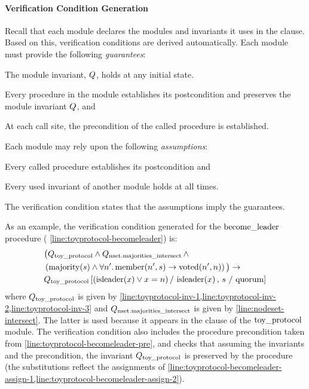 \paragraph{Verification Condition Generation}
Recall that each module declares the modules and invariants it uses in the  clause.
Based on this, verification conditions are derived automatically.
Each module must provide the following \emph{guarantees}:
\begin{inparaenum}[1)]
\item The module invariant, $Q$, holds at any initial state.
\item Every procedure in the module establishes its postcondition and preserves the module invariant $Q$, and
\item At each call site, the precondition of the called procedure is established.
\end{inparaenum}
Each module may rely upon the following \emph{assumptions}:
\begin{inparaenum}[1)]
\item Every called procedure establishes its postcondition and
\item Every used invariant of another module holds at all times.
\end{inparaenum}
The verification condition states that the assumptions imply the guarantees.

As an example, the verification condition generated for the ${\text{become\_leader}}$ procedure ( \cref{line:toyprotocol-becomeleader}) is:
\begin{align*}
&
\big( Q_{\text{toy\_protocol}} \land
Q_{{\text{nset}}.{\text{majorities\_intersect}}} \, \land \\
&
\left( {\text{majority}}(s) \land \forall n'. \, {\text{member}}(n' , s) \to {\text{voted}}(n', n) \right)
\big) \to \\
&
Q_{\text{toy\_protocol}} \left[\left({\text{isleader}}(x) \lor x=n\right) /~ {\text{isleader}}(x) \,,\,  s ~/~ {\text{quorum}} \right]
\end{align*}
where $Q_{\text{toy\_protocol}}$ is given by 
\cref{line:toyprotocol-inv-1,line:toyprotocol-inv-2,line:toyprotocol-inv-3} and \linebreak $Q_{{\text{nset}}.{\text{majorities\_intersect}}}$
is given by  \cref{line:nodeset-intersect}.  The
latter is used because it appears in the  clause of the
${\text{toy\_protocol}}$ module.  The verification condition also includes the
procedure precondition taken from 
\cref{line:toyprotocol-becomeleader-pre}, and checks that assuming the
invariants and the precondition, the invariant
$Q_{\text{toy\_protocol}}$ is preserved by the procedure (the
substitutions reflect the assignments of
\cref{line:toyprotocol-becomeleader-assign-1,line:toyprotocol-becomeleader-assign-2}).

